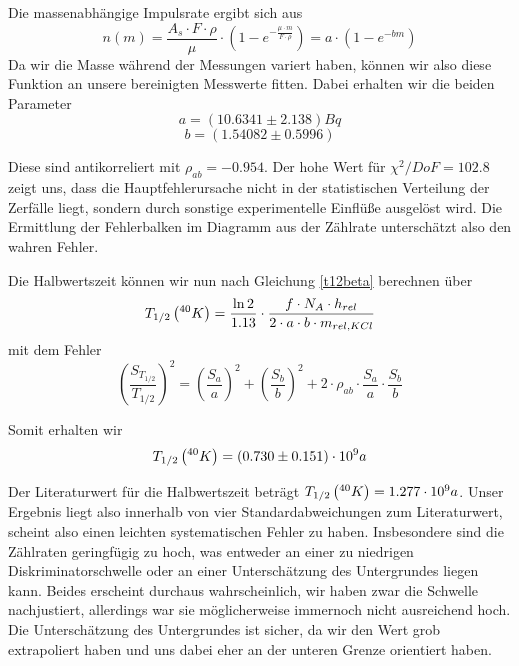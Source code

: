 Die massenabhängige Impulsrate ergibt sich aus
\begin{equation}
 n(m) = \frac{A_s \cdot F \cdot \rho}{\mu} \cdot \left( 1 - e^{-\frac{\mu \cdot m}{F \cdot \rho}} \right) = a \cdot \left( 1 - e^{-bm} \right)
\end{equation}
Da wir die Masse während der Messungen variert haben, können wir also diese Funktion an unsere bereinigten Messwerte fitten. Dabei erhalten wir die beiden Parameter
$$ a = (10.6341 \pm 2.138) Bq $$
$$ b = (1.54082 \pm  0.5996) $$

Diese sind antikorreliert mit $\rho_{ab} = -0.954$. Der hohe Wert für $\chi^2/DoF = 102.8$ zeigt uns, dass die Hauptfehlerursache nicht in der statistischen Verteilung der Zerfälle liegt, sondern durch sonstige experimentelle Einflüße ausgelöst wird. Die Ermittlung der Fehlerbalken im Diagramm aus der Zählrate unterschätzt also den wahren Fehler. 

Die Halbwertszeit können wir nun nach Gleichung \ref{t12beta} berechnen über
\begin{equation}
 T_{1/2}\left( ^{40}_{}{K} \right) = \frac{\ln 2}{1.13} \cdot \frac{f \cdot N_A \cdot h_{rel}}{2 \cdot a \cdot b \cdot m_{rel,KCl}}
\end{equation}
mit dem Fehler
\begin{equation}
 \left( \frac{S_{T_{1/2}}}{T_{1/2}} \right)^2 = \left( \frac{S_a}{a} \right)^2 + \left( \frac{S_b}{b} \right)^2 + 2 \cdot \rho_{ab} \cdot \frac{S_a}{a} \cdot \frac{S_b}{b}
\end{equation}

Somit erhalten wir $$T_{1/2} \left( ^{40}_{}{K} \right) = ( 0.730 \pm 0.151 ) \cdot 10^9 a$$

Der Literaturwert für die Halbwertszeit beträgt $T_{1/2} \left( ^{40}_{}{K} \right) = 1.277 \cdot 10^9 a$. Unser Ergebnis liegt also innerhalb von vier Standardabweichungen zum Literaturwert, scheint also einen leichten systematischen Fehler zu haben. Insbesondere sind die Zählraten geringfügig zu hoch, was entweder an einer zu niedrigen Diskriminatorschwelle oder an einer Unterschätzung des Untergrundes liegen kann. Beides erscheint durchaus wahrscheinlich, wir haben zwar die Schwelle nachjustiert, allerdings war sie möglicherweise immernoch nicht ausreichend hoch. Die Unterschätzung des Untergrundes ist sicher, da wir den Wert grob extrapoliert haben und uns dabei eher an der unteren Grenze orientiert haben. 